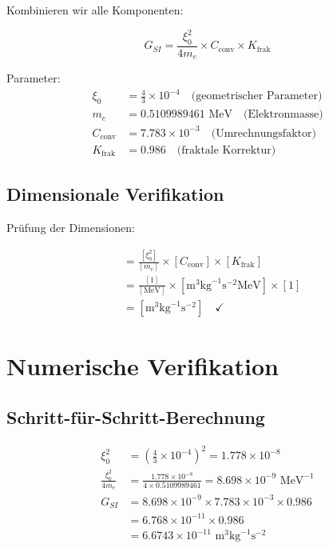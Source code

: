 \documentclass[12pt,a4paper]{article}
\newcommand{\Kfrak}{K_{\text{frak}}}
\newcommand{\Cconv}{C_{\text{conv}}}
\begin{document}
	Kombinieren wir alle Komponenten:
	
	\begin{correct}
		\begin{equation}
			\boxed{G_{SI} = \frac{\xi_0^2}{4 m_e} \times \Cconv \times \Kfrak}
			\label{eq:g_complete}
		\end{equation}
		
		Parameter:
		\begin{align}
			\xi_0 &= \frac{4}{3} \times 10^{-4} \quad \text{(geometrischer Parameter)} \\
			m_e &= 0.5109989461 \text{ MeV} \quad \text{(Elektronmasse)} \\
			\Cconv &= 7.783 \times 10^{-3} \quad \text{(Umrechnungsfaktor)} \\
			\Kfrak &= 0.986 \quad \text{(fraktale Korrektur)}
		\end{align}
	\end{correct}
	
	\subsection{Dimensionale Verifikation}
	
	Prüfung der Dimensionen:
	
	\begin{align}
		[G_{SI}] &= \frac{[\xi_0^2]}{[m_e]} \times [\Cconv] \times [\Kfrak] \\
		&= \frac{[1]}{[\text{MeV}]} \times [\text{m}^3 \text{kg}^{-1} \text{s}^{-2} \text{MeV}] \times [1] \\
		&= [\text{m}^3 \text{kg}^{-1} \text{s}^{-2}] \quad \checkmark
	\end{align}
	
	\section{Numerische Verifikation}
	
	\subsection{Schritt-für-Schritt-Berechnung}
	
	\begin{align}
		\xi_0^2 &= \left(\frac{4}{3} \times 10^{-4}\right)^2 = 1.778 \times 10^{-8} \\
		\frac{\xi_0^2}{4 m_e} &= \frac{1.778 \times 10^{-8}}{4 \times 0.5109989461} = 8.698 \times 10^{-9} \text{ MeV}^{-1} \\
		G_{SI} &= 8.698 \times 10^{-9} \times 7.783 \times 10^{-3} \times 0.986 \\
		&= 6.768 \times 10^{-11} \times 0.986 \\
		&= 6.6743 \times 10^{-11} \text{ m}^3 \text{kg}^{-1} \text{s}^{-2}
	\end{align}
	
\end{document}
